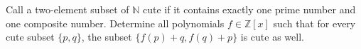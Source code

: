 Call a two-element subset of $\mathbb{N}$ cute if it contains exactly one prime number and one composite number. Determine all polynomials $f \in \mathbb{Z}[x]$ such that for every cute subset $ \{ p,q \}$,  the subset $ \{ f(p) + q, f(q) + p \} $ is cute as well.